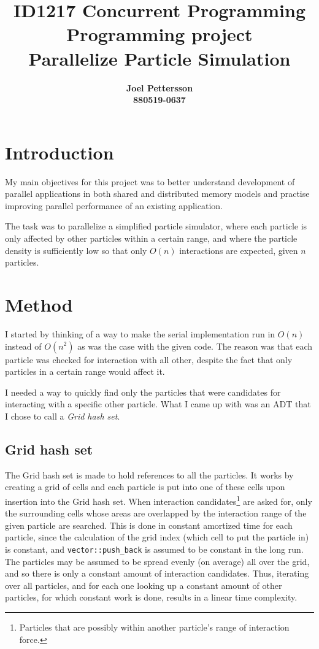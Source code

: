 \documentclass[12pt,a4paper]{article}
\title{
    {\normalsize\sc ID1217 Concurrent Programming} \\ 
    {\large Programming project} \\
    Parallelize Particle Simulation
}
\author{
    \bf Joel Pettersson \\
    \bf 880519-0637 \\
}
\begin{document}
\maketitle

\section{Introduction}

My main objectives for this project was to better understand development of
parallel applications in both shared and distributed memory models and practise
improving parallel performance of an existing application.

The task was to parallelize a simplified particle simulator, where each
particle is only affected by other particles within a certain range, and where
the particle density is sufficiently low so that only $O(n)$ interactions are
expected, given $n$ particles.

\section{Method}

I started by thinking of a way to make the serial implementation run in $O(n)$
instead of $O(n^2)$ as was the case with the given code. The reason was that
each particle was checked for interaction with all other, despite the fact that
only particles in a certain range would affect it. 

I needed a way to quickly find only the particles that were candidates for
interacting with a specific other particle. What I came up with was an ADT that
I chose to call a \emph{Grid hash set}.

\subsection{Grid hash set}

The Grid hash set is made to hold references to all the particles. It works by
creating a grid of cells and each particle is put into one of these cells upon
insertion into the Grid hash set. When interaction candidates\footnote{
Particles that are possibly within another particle's range of interaction
force.} are asked for, only the surrounding cells whose areas are overlapped by
the interaction range of the given particle are searched. This is done in
constant amortized time for each particle, since the calculation of the grid
index (which cell to put the particle in) is constant, and
\texttt{vector::push\_back} is assumed to be constant in the long run. The
particles may be assumed to be spread evenly (on average) all over the grid,
and so there is only a constant amount of interaction candidates. Thus,
iterating over all particles, and for each one looking up a constant amount of
other particles, for which constant work is done, results in a linear time
complexity.
\end{document}
